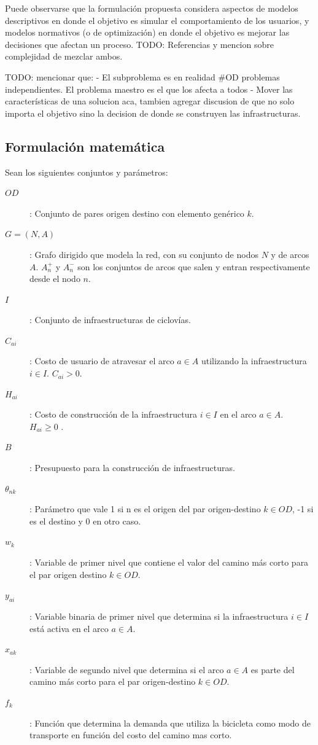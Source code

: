 \documentclass{article}
\begin{document}
  Puede observarse que la formulación propuesta considera aspectos de modelos descriptivos en donde el objetivo es simular el comportamiento de los usuarios, y modelos normativos (o de optimización) en donde el objetivo es mejorar las decisiones que afectan un proceso. TODO: Referencias y mencion sobre complejidad de mezclar ambos.

  TODO: mencionar que:
  - El subproblema es en realidad \#OD problemas independientes.
    El problema maestro es el que los afecta a todos
  - Mover las características de una solucion aca, tambien agregar discusion de que no solo importa el objetivo sino la decision de donde se construyen las infrastructuras.

  \subsection*{Formulación matemática}

  Sean los siguientes conjuntos y parámetros:

  \begin{description}
    \item[$OD$]: Conjunto de pares origen destino con elemento genérico $k$.
    \item[$G=(N,A)$]: Grafo dirigido que modela la red, con su conjunto de nodos $N$ y de arcos $A$. $A_n^+$ y $A_n^-$ son los conjuntos de arcos que salen y entran respectivamente desde el nodo $n$.
    \item[$I$]: Conjunto de infraestructuras de ciclovías.
    \item[$C_{ai}$]: Costo de usuario de atravesar el arco $a \in A$ utilizando la infraestructura $i \in I$. $C_{ai} > 0$.
    \item[$H_{ai}$]: Costo de construcción de la infraestructura $i \in I$ en el arco $a \in A$. $H_{ai} \geq 0$ .
    \item[$B$]: Presupuesto para la construcción de infraestructuras.
    \item[$\theta_{nk}$]: Parámetro que vale 1 si n es el origen del par origen-destino $k \in OD$, -1 si es el destino y 0 en otro caso.
    \item[$w_k$]: Variable de primer nivel que contiene el valor del camino más corto para el par origen destino $k \in OD$.
    \item[$y_{ai}$]: Variable binaria de primer nivel que determina si la infraestructura $i \in I$ está activa en el arco $a \in A$.
    \item[$x_{ak}$]: Variable de segundo nivel que determina si el arco $a \in A$ es parte del camino más corto para el par origen-destino $k \in OD$.
    \item[$f_k$]: Función que determina la demanda que utiliza la bicicleta como modo de transporte en función del costo del camino mas corto.
  \end{description}
\end{document}
